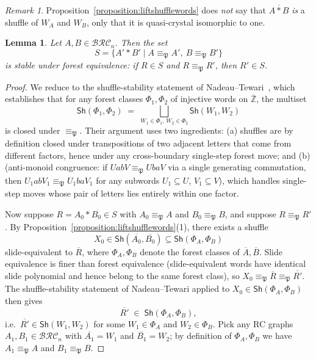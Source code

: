 \documentclass{amsart}
\newtheorem{lemma}{Lemma}[subsection]
\theoremstyle{definition}
\theoremstyle{remark}
\newtheorem*{remark}{Remark}
\numberwithin{equation}{subsection}
\newcommand{\BRC}{\mathcal{BRC}}
\newcommand{\forest}{\mathfrak{P}}
\begin{document}
\begin{remark}
Proposition~\ref{proposition:liftshufflewords} does \emph{not} say that $\overline{A*B}$ \emph{is} a shuffle of $W_A$ and $W_B$, only that it is quasi-crystal isomorphic to one.
\end{remark}

\begin{lemma}\label{lemma:foreststable}
Let $A,B\in\BRC_n$. Then the set
$$S=\{A'*B'\mid A\equiv_\forest A',\ B\equiv_\forest B'\}$$
is stable under forest equivalence: if $R\in S$ and $R\equiv_\forest R'$, then $R'\in S$.
\end{lemma}
\begin{proof}
We reduce to the shuffle-stability statement of Nadeau--Tewari~\cite[proof of Theorem~6.3]{nadeau2024forest}, which establishes that for any forest classes $\Phi_1,\Phi_2$ of injective words on $\overline{\mathbb{Z}}$, the multiset
\[
\mathsf{Sh}(\Phi_1,\Phi_2)\;=\;\bigsqcup_{W_1\in\Phi_1,\,W_2\in\Phi_2}\mathsf{Sh}(W_1,W_2)
\]
is closed under $\equiv_\forest$. Their argument uses two ingredients: (a) shuffles are by definition closed under transpositions of two adjacent letters that come from different factors, hence under any cross-boundary single-step forest move; and (b) \cite[Lemma~5.10]{nadeau2024forest} (anti-monoid congruence: if $UabV\equiv_\forest UbaV$ via a single generating commutation, then $U_1abV_1\equiv_\forest U_1baV_1$ for any subwords $U_1\subseteq U$, $V_1\subseteq V$), which handles single-step moves whose pair of letters lies entirely within one factor.

Now suppose $R=A_0*B_0\in S$ with $A_0\equiv_\forest A$ and $B_0\equiv_\forest B$, and suppose $R\equiv_\forest R'$. By Proposition~\ref{proposition:liftshufflewords}(1), there exists a shuffle
\[
X_0\in\mathsf{Sh}(\overline{A_0},\overline{B_0})\subseteq\mathsf{Sh}(\Phi_A,\Phi_B)
\]
slide-equivalent to $\overline{R}$, where $\Phi_A,\Phi_B$ denote the forest classes of $\overline{A},\overline{B}$. Slide equivalence is finer than forest equivalence (slide-equivalent words have identical slide polynomial and hence belong to the same forest class), so $X_0\equiv_\forest\overline{R}\equiv_\forest\overline{R'}$. The shuffle-stability statement of Nadeau--Tewari applied to $X_0\in\mathsf{Sh}(\Phi_A,\Phi_B)$ then gives
\[
\overline{R'}\;\in\;\mathsf{Sh}(\Phi_A,\Phi_B),
\]
i.e.\ $\overline{R'}\in\mathsf{Sh}(W_1,W_2)$ for some $W_1\in\Phi_A$ and $W_2\in\Phi_B$. Pick any RC graphs $A_1,B_1\in\BRC_n$ with $\overline{A_1}=W_1$ and $\overline{B_1}=W_2$; by definition of $\Phi_A,\Phi_B$ we have $A_1\equiv_\forest A$ and $B_1\equiv_\forest B$.


\end{proof}
\end{document}
